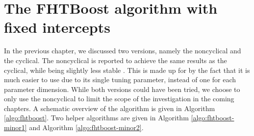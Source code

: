 \section{The FHTBoost algorithm with fixed intercepts}
In the previous chapter, we discussed two versions, namely the noncyclical and the cyclical.
The noncyclical is reported to achieve the same results as the cyclical, while being slightly less stable \citep{thomas2018}.
This is made up for by the fact that it is much easier to use due to its single tuning parameter, instead of one for each parameter dimension.
While both versions could have been tried, we choose to only use the noncyclical to limit the scope of the investigation in the coming chapters.
A schematic overview of the algorithm is given in Algorithm \ref{algo:fhtboost}.
Two helper algorithms are given in Algorithm \ref{algo:fhtboost-minor1} and Algorithm \ref{algo:fhtboost-minor2}.


